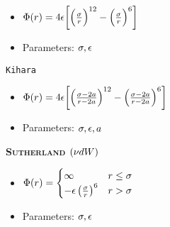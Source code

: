 \begin{mdframed}
\begin{itemize}[label=]
    \item $\pot(\pos) = 4\dielec\bigg[\Big(\frac{\molecrad}{\pos}\Big)^{12}-\Big(\frac{\molecrad}{\pos}\Big)^6\bigg] $
	
    \item Parameters: $\molecrad, \dielec$

	\end{itemize}
  
    \texttt{Kihara}
    
    \begin{itemize}[label={---}]
	
    \item $\pot(\pos) = 4\dielec\bigg[\Big(\frac{\molecrad-2\activity}{\pos-2\activity}\Big)^{12}-\Big(\frac{\molecrad-2\activity}{\pos-2\activity}\Big)^6\bigg] $
    
    \item Parameters: $\molecrad, \dielec, \activity$

	\end{itemize}

    
    {\bfseries\textsc{Sutherland} $(\freq d\work)$}
    
	\begin{itemize}[label=]
    
	\item $\pot(\pos)=\begin{cases}
                    \infty & \pos \leq \molecrad\\
                    -\dielec\left(\frac{\molecrad}{\pos}\right)^6& \pos > \molecrad
                \end{cases}$
                
	\item Parameters: $\molecrad, \dielec$
    
	\end{itemize}
   
\end{mdframed}